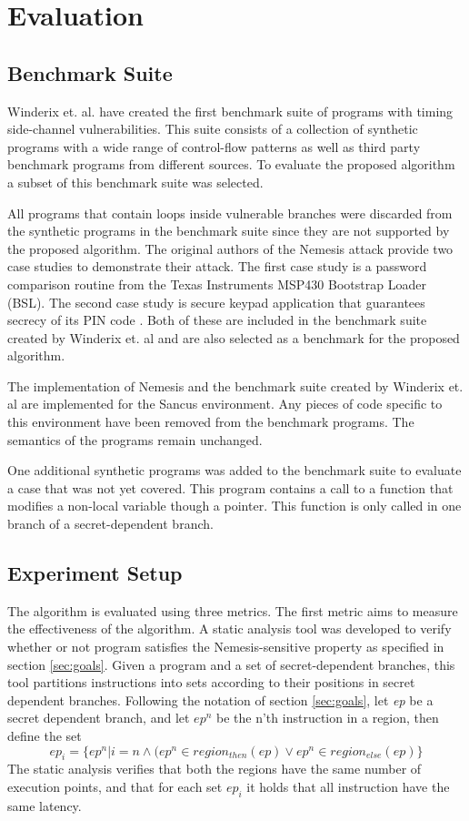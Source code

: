 
\chapter{Evaluation}
\section{Benchmark Suite}
Winderix et. al. \cite{WinderixHans} have created the first benchmark suite of programs with timing side-channel vulnerabilities. This suite consists of a 
collection of synthetic programs with a wide range of control-flow patterns as well as third party benchmark programs from different sources. 
To evaluate the proposed algorithm a subset of this benchmark suite was selected. 

All programs that contain loops inside vulnerable branches were discarded from the synthetic programs in the benchmark suite
since they are not supported by the proposed algorithm. 
The original authors of the Nemesis attack provide two case studies to demonstrate their attack. 
The first case study is a password comparison routine from the Texas Instruments MSP430 Bootstrap Loader (BSL). 
The second case study is secure keypad application that guarantees secrecy of its PIN code \cite{Nemesis}.
Both of these are included in the benchmark suite created by Winderix et. al and are also selected as a benchmark for the proposed algorithm. 

The implementation of Nemesis and the benchmark suite created by Winderix et. al are implemented for the Sancus environment. Any pieces of code specific to this
environment have been removed from the benchmark programs. The semantics of the programs remain unchanged. 

One additional synthetic programs was added to the benchmark suite to evaluate a case that was not yet covered. This program contains a call to a function that 
modifies a non-local variable though a pointer. This function is only called in one branch of a secret-dependent branch. 

\section{Experiment Setup}
The algorithm is evaluated using three metrics. The first metric aims to measure the effectiveness of the algorithm. A static analysis tool was developed to verify 
whether or not program satisfies the Nemesis-sensitive property as specified in section \ref{sec:goals}.
Given a program and a set of secret-dependent branches, this tool partitions instructions into sets according to their positions in secret dependent branches. Following the notation of section \ref{sec:goals}, let \textit{ep} be a secret dependent branch, and let $ep^n$ be the n'th instruction in a region, then define the set 
\begin{equation} \label{eq:toolSets}
    ep_i = \{ ep^n |i = n \land  (ep^n \in region_{then}(ep) \lor ep^n \in region_{else}(ep)\}
\end{equation}
The static analysis verifies that both the regions have the same number of execution points, and that for each set $ep_i$ it holds that all 
instruction have the same latency.

